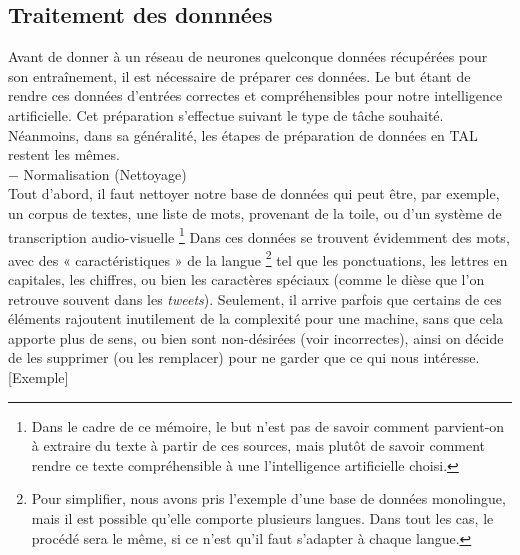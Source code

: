 \documentclass[12pt, french]{report}
\begin{document}
\subsection{Traitement des donnnées}

Avant de donner à un réseau de neurones quelconque données récupérées pour son entraînement, il est nécessaire de préparer ces données. Le but étant de rendre ces données d'entrées correctes et compréhensibles pour notre intelligence artificielle. Cet préparation s'effectue suivant le type de tâche souhaité. Néanmoins, dans sa généralité, les étapes de préparation de données en TAL restent les mêmes.\\

$-$ Normalisation (Nettoyage)\\
    Tout d'abord, il faut nettoyer notre base de données qui peut être, par exemple, un corpus de textes, une liste de mots, provenant de la toile, ou d'un système de transcription audio-visuelle \footnote{Dans le cadre de ce mémoire, le but n'est pas de savoir comment parvient-on à extraire du texte à partir de ces sources, mais plutôt de savoir comment rendre ce texte compréhensible à une l'intelligence artificielle choisi.}
    Dans ces données se trouvent évidemment des mots, avec des « caractéristiques » de la  langue \footnote{Pour simplifier, nous avons pris l'exemple d'une base de données  monolingue, mais il est possible qu'elle comporte plusieurs langues. Dans tout les cas, le procédé sera le même, si ce n'est qu'il faut s'adapter à chaque langue.} tel que les ponctuations, les lettres en capitales, les chiffres, ou bien les caractères spéciaux (comme le dièse que l'on retrouve souvent dans les \textit{tweets}). Seulement, il arrive parfois que certains de ces éléments rajoutent inutilement de la complexité pour une machine, sans que cela apporte plus de sens, ou bien sont non-désirées (voir incorrectes), ainsi on décide de les supprimer (ou les remplacer) pour ne garder que ce qui nous intéresse. [Exemple]\\
\end{document}
